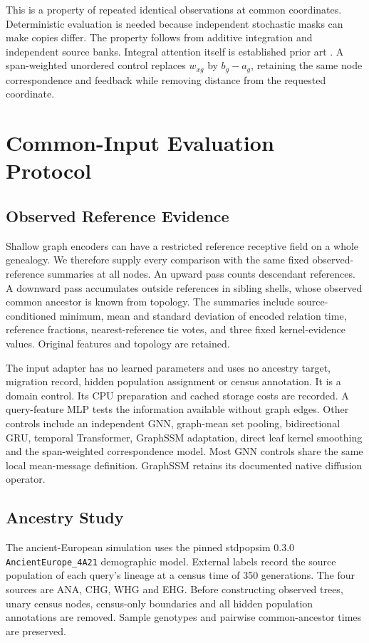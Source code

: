 \documentclass[letterpaper]{article}
\begin{document}
This is a property of repeated identical observations at common coordinates. Deterministic evaluation is needed because independent stochastic masks can make copies differ. The property follows from additive integration and independent source banks. Integral attention itself is established prior art \citep{continuum2024}. A span-weighted unordered control replaces $w_{xg}$ by $b_g-a_g$, retaining the same node correspondence and feedback while removing distance from the requested coordinate.

\section{Common-Input Evaluation Protocol}
\subsection{Observed Reference Evidence}
Shallow graph encoders can have a restricted reference receptive field on a whole genealogy. We therefore supply every comparison with the same fixed observed-reference summaries at all nodes. An upward pass counts descendant references. A downward pass accumulates outside references in sibling shells, whose observed common ancestor is known from topology. The summaries include source-conditioned minimum, mean and standard deviation of encoded relation time, reference fractions, nearest-reference tie votes, and three fixed kernel-evidence values. Original features and topology are retained.

The input adapter has no learned parameters and uses no ancestry target, migration record, hidden population assignment or census annotation. It is a domain control. Its CPU preparation and cached storage costs are recorded. A query-feature MLP tests the information available without graph edges. Other controls include an independent GNN, graph-mean set pooling, bidirectional GRU, temporal Transformer, GraphSSM adaptation, direct leaf kernel smoothing and the span-weighted correspondence model. Most GNN controls share the same local mean-message definition. GraphSSM retains its documented native diffusion operator.

\subsection{Ancestry Study}
The ancient-European simulation uses the pinned stdpopsim 0.3.0 \texttt{AncientEurope\_4A21} demographic model. External labels record the source population of each query's lineage at a census time of 350 generations. The four sources are ANA, CHG, WHG and EHG. Before constructing observed trees, unary census nodes, census-only boundaries and all hidden population annotations are removed. Sample genotypes and pairwise common-ancestor times are preserved.
\end{document}
